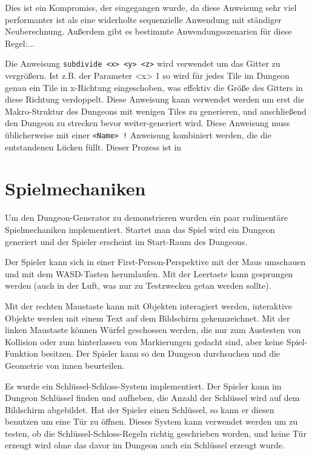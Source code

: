 Dies ist ein Kompromiss, der eingegangen wurde, da diese Anweisung sehr viel performanter ist als eine widerholte sequenzielle Anwendung mit ständiger Neuberechnung. Außerdem gibt es bestimmte Anwendungsszenarien für diese Regel:...

Die Anweisung \texttt{subdivide <x> <y> <z>} wird verwendet um das Gitter zu vergrößern. Ist z.B. der Parameter <x> 1 so wird für jedes Tile im Dungeon genau ein Tile in x-Richtung eingeschoben, was effektiv die Größe des Gitters in diese Richtung verdoppelt. Diese Anweisung kann verwendet werden um erst die Makro-Struktur des Dungeons mit wenigen Tiles zu generieren, und anschließend den Dungeon zu strecken bevor weiter-generiert wird. Diese Anweisung muss üblicherweise mit einer \texttt{<Name> !} Anweisung kombiniert werden, die die entstandenen Lücken füllt. Dieser Prozess ist in 


\section{Spielmechaniken}\label{s.spielmechaniken}

Um den Dungeon-Generator zu demonstrieren wurden ein paar rudimentäre Spielmechaniken implementiert. Startet man das Spiel wird ein Dungeon generiert und der Spieler erscheint im Start-Raum des Dungeons.

Der Spieler kann sich in einer First-Person-Perspektive mit der Maus umschauen und mit dem WASD-Tasten herumlaufen. Mit der Leertaste kann gesprungen werden (auch in der Luft, was nur zu Testzwecken getan werden sollte).

Mit der rechten Maustaste kann mit Objekten interagiert werden, interaktive Objekte werden mit einem Text auf dem Bildschirm gekennzeichnet. Mit der linken Maustaste können Würfel geschossen werden, die nur zum Austesten von Kollision oder zum hinterlassen von Markierungen gedacht sind, aber keine Spiel-Funktion besitzen. Der Spieler kann so den Dungeon durchsuchen und die Geometrie von innen beurteilen. 

Es wurde ein Schlüssel-Schloss-System implementiert. Der Spieler kann im Dungeon Schlüssel finden und aufheben, die Anzahl der Schlüssel wird auf dem Bildschirm abgebildet. Hat der Spieler einen Schlüssel, so kann er diesen benutzen um eine Tür zu öffnen. Dieses System kann verwendet werden um zu testen, ob die Schlüssel-Schloss-Regeln richtig geschrieben worden, und keine Tür erzeugt wird ohne das davor im Dungeon auch ein Schlüssel erzeugt wurde.

